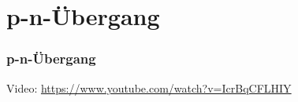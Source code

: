 


\section*{p-n-Übergang}

\begin{frame}
  \frametitle{p-n-Übergang}
  \begin{center}
    Video: \url{https://www.youtube.com/watch?v=IcrBqCFLHIY}
  \end{center}
\end{frame}

